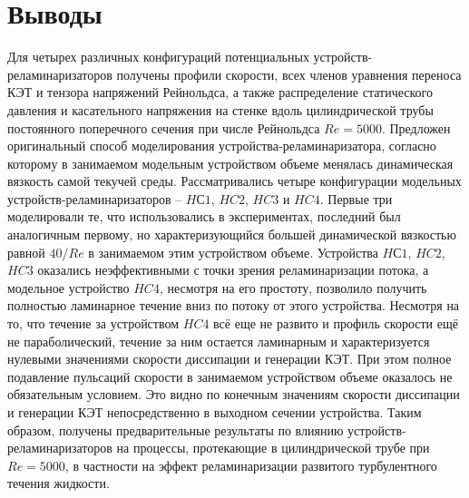 \section{Выводы}\label{ch3:conclusion}
%
Для четырех различных конфигураций потенциальных устройств-реламинаризаторов получены профили скорости, 
всех членов уравнения переноса КЭТ и тензора напряжений Рейнольдса, 
а также распределение статического давления и касательного напряжения 
на стенке вдоль цилиндрической трубы постоянного поперечного сечения при числе Рейнольдса $Re = 5000$. 
%
Предложен оригинальный способ моделирования устройства-реламинаризатора, 
согласно которому в занимаемом модельным устройством объеме менялась динамическая вязкость самой текучей среды. 
%
Рассматривались четыре конфигурации модельных устройств-реламинаризаторов -- $HС1$, $HC2$, $HC3$ и $HC4$. 
%
Первые три моделировали те, что использовались в экспериментах, 
последний был аналогичным первому, 
но характеризующийся большей динамической вязкостью равной $40/Re$ в занимаемом этим устройством объеме. 
%
Устройства $HС1$, $HC2$, $HC3$ оказались неэффективными с точки зрения реламинаризации потока, 
а модельное устройство $HC4$, несмотря на его простоту, 
позволило получить полностью ламинарное течение вниз по потоку от этого устройства. 
%
Несмотря на то, что течение за устройством $HC4$ всё еще не развито и профиль скорости ещё не параболический, 
течение за ним остается ламинарным и характеризуется нулевыми значениями скорости диссипации и генерации КЭТ. 
%
При этом полное подавление пульсаций скорости в занимаемом устройством объеме оказалось не обязательным условием. 
%
Это видно по конечным значениям скорости диссипации и генерации КЭТ непосредственно в выходном сечении устройства. 
%
Таким образом, получены предварительные результаты по влиянию устройств-реламинаризаторов на процессы, 
протекающие в цилиндрической трубе при $Re = 5000$, 
в частности на эффект реламинаризации развитого турбулентного течения жидкости.






